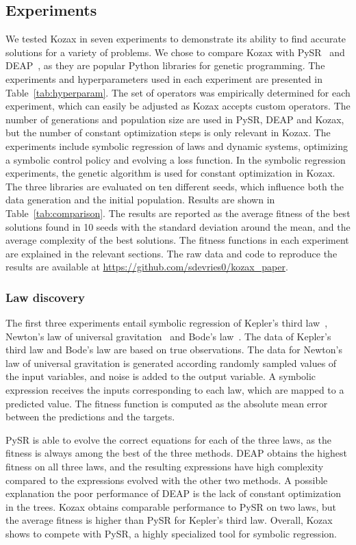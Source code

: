 \documentclass{article}
\begin{document}
\subsection{Experiments}
We tested Kozax in seven experiments to demonstrate its ability to find accurate solutions for a variety of problems. We chose to compare Kozax with PySR~\cite{cranmer2023interpretable} and DEAP~\cite{fortin2012deap}, as they are popular Python libraries for genetic programming. 
The experiments and hyperparameters used in each experiment are presented in Table~\ref{tab:hyperparam}. The set of operators was empirically determined for each experiment, which can easily be adjusted as Kozax accepts custom operators. The number of generations and population size are used in PySR, DEAP and Kozax, but the number of constant optimization steps is only relevant in Kozax. The experiments include symbolic regression of laws and dynamic systems, optimizing a symbolic control policy and evolving a loss function. In the symbolic regression experiments, the genetic algorithm is used for constant optimization in Kozax. The three libraries are evaluated on ten different seeds, which influence both the data generation and the initial population. Results are shown in Table~\ref{tab:comparison}. The results are reported as the average fitness of the best solutions found in 10 seeds with the standard deviation around the mean, and the average complexity of the best solutions. The fitness functions in each experiment are explained in the relevant sections. The raw data and code to reproduce the results are available at \url{https://github.com/sdevries0/kozax_paper}.

\subsubsection{Law discovery}
The first three experiments entail symbolic regression of Kepler's third law~\cite{kepler1997harmony}, Newton's law of universal gravitation~\cite{newton1987philosophiae} and Bode's law~\cite{bonnet1781contemplation}. The data of Kepler's third law and Bode's law are based on true observations. The data for Newton's law of universal gravitation is generated according randomly sampled values of the input variables, and noise is added to the output variable. A symbolic expression receives the inputs corresponding to each law, which are mapped to a predicted value. The fitness function is computed as the absolute mean error between the predictions and the targets.

PySR is able to evolve the correct equations for each of the three laws, as the fitness is always among the best of the three methods. DEAP obtains the highest fitness on all three laws, and the resulting expressions have high complexity compared to the expressions evolved with the other two methods. A possible explanation the poor performance of DEAP is the lack of constant optimization in the trees. Kozax obtains comparable performance to PySR on two laws, but the average fitness is higher than PySR for Kepler's third law. Overall, Kozax shows to compete with PySR, a highly specialized tool for symbolic regression.
\end{document}
